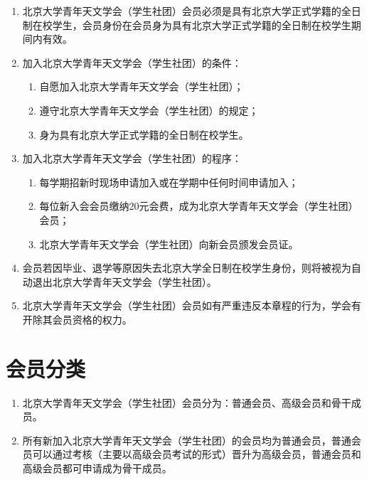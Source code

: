 \begin{enumerate}[resume]
    \item 北京大学青年天文学会（学生社团）会员必须是具有北京大学正式学籍的全日制在校学生，会员身份在会员身为具有北京大学正式学籍的全日制在校学生期间内有效。
    
    \item 加入北京大学青年天文学会（学生社团）的条件：
    
    \begin{enumerate}
        \item 自愿加入北京大学青年天文学会（学生社团）；
        \item 遵守北京大学青年天文学会（学生社团）的规定；
        \item 身为具有北京大学正式学籍的全日制在校学生。
    \end{enumerate}
    
    \item 加入北京大学青年天文学会（学生社团）的程序：
    
    \begin{enumerate}
        \item 每学期招新时现场申请加入或在学期中任何时间申请加入；
        \item 每位新入会会员缴纳20元会费，成为北京大学青年天文学会（学生社团）会员；
        \item 北京大学青年天文学会（学生社团）向新会员颁发会员证。
    \end{enumerate}

    \item 会员若因毕业、退学等原因失去北京大学全日制在校学生身份，则将被视为自动退出北京大学青年天文学会（学生社团）。

    \item 北京大学青年天文学会（学生社团）会员如有严重违反本章程的行为，学会有开除其会员资格的权力。 

\end{enumerate}

\section{会员分类}

\begin{enumerate}[resume]
    \item 北京大学青年天文学会（学生社团）会员分为：普通会员、高级会员和骨干成员。
    
    \item 所有新加入北京大学青年天文学会（学生社团）的会员均为普通会员，普通会员可以通过考核（主要以高级会员考试的形式）晋升为高级会员，普通会员和高级会员都可申请成为骨干成员。
\end{enumerate}

